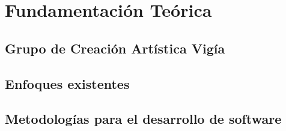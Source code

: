 \chapter{Fundamentación Teórica}
\pagestyle{fancy}
\lhead{}
\chead{}
\lfoot{}
\cfoot{\thepage}
\rfoot{}
\renewcommand{\headrulewidth}{0.4pt}
 \vspace{-1cm}




\section{Grupo de Creación Artística Vigía}



\section{Enfoques existentes}



%

%

\section{Metodologías para el desarrollo de software}


